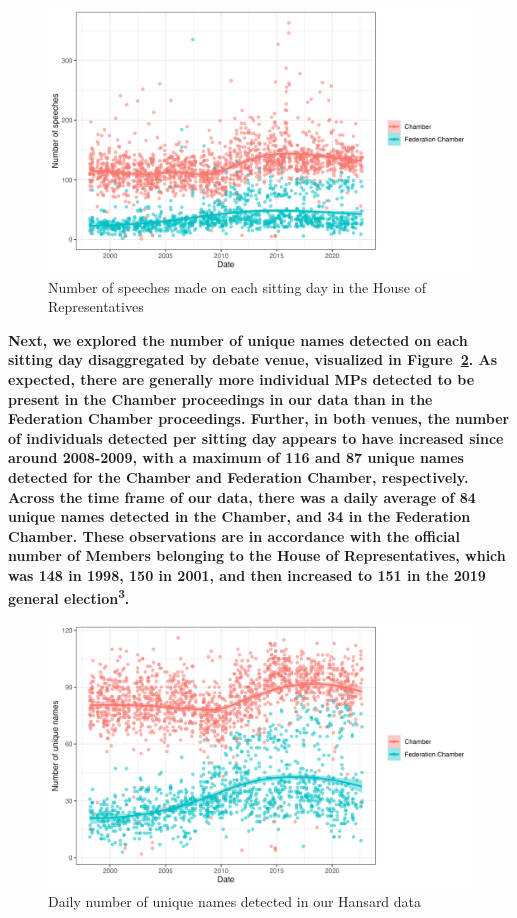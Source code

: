 \documentclass[
  letterpaper,
  DIV=11,
  numbers=noendperiod]{scrartcl}
\begin{document}
\begin{figure}

{\centering \includegraphics[width=4.58333in,height=\textheight]{n_daily_speeches.png}

}

\caption{\label{fig-dailyspeeches}Number of speeches made on each
sitting day in the House of Representatives}

\end{figure}

\textbf{Next, we explored the number of unique names detected on each
sitting day disaggregated by debate venue, visualized in
Figure~\ref{fig-names}. As expected, there are generally more individual
MPs detected to be present in the Chamber proceedings in our data than
in the Federation Chamber proceedings. Further, in both venues, the
number of individuals detected per sitting day appears to have increased
since around 2008-2009, with a maximum of 116 and 87 unique names
detected for the Chamber and Federation Chamber, respectively. Across
the time frame of our data, there was a daily average of 84 unique names
detected in the Chamber, and 34 in the Federation Chamber. These
observations are in accordance with the official number of Members
belonging to the House of Representatives, which was 148 in 1998, 150 in
2001, and then increased to 151 in the 2019 general
election\textsuperscript{3}.}

\begin{figure}

{\centering \includegraphics[width=4.58333in,height=\textheight]{n_unique_names.png}

}

\caption{\label{fig-names}Daily number of unique names detected in our
Hansard data}

\end{figure}
\end{document}
